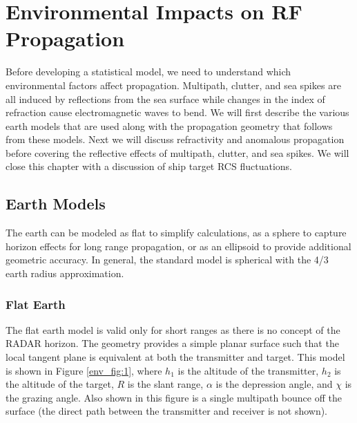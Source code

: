 \renewcommand{\baselinestretch}{2} \small\normalsize
\section{Environmental Impacts on RF Propagation}\label{chapter_env}
Before developing a statistical model, we need to understand which environmental factors affect propagation. Multipath, clutter, and sea spikes are all induced by reflections from the sea surface while changes in the index of refraction cause electromagnetic waves to bend. We will first describe the various earth models that are used along with the propagation geometry that follows from these models. Next we will discuss refractivity and anomalous propagation before covering the reflective effects of multipath, clutter, and sea spikes. We will close this chapter with a discussion of ship target RCS fluctuations.

\subsection{Earth Models}
The earth can be modeled as flat to simplify calculations, as a sphere to capture horizon effects for long range propagation, or as an ellipsoid to provide additional geometric accuracy. In general, the standard model is spherical with the 4/3 earth radius approximation.

\subsubsection{Flat Earth}
The flat earth model is valid only for short ranges as there is no concept of the RADAR horizon. The geometry provides a simple planar surface such that the local tangent plane is equivalent at both the transmitter and target. This model is shown in Figure \ref{env_fig:1}, where $h_1$ is the altitude of the transmitter, $h_2$ is the altitude of the target, $R$ is the slant range, $\alpha$ is the depression angle, and $\chi$ is the grazing angle. Also shown in this figure is a single multipath bounce off the surface (the direct path between the transmitter and receiver is not shown). 

